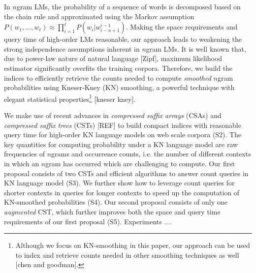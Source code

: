 In $n$gram LMs, the probability of a sequence of words is decomposed based on the chain rule 
and approximated using the Markov assumption 
$P(w_1,\ldots,w_{\ell}) \approx \prod_{i=1}^{\ell} P(w_i|w_{i-n+1}^{i-1})$. 
%
%
Making the space requirements  and query time of high-order LMs reasonable,
our approach leads to weakening the strong independence assumptions inherent in $n$gram LMs.
%
It is well known that, due to power-law nature of natural language [Zipf], maximum likelihood 
estimator significantly overfits the training corpora. 
%
Therefore, we build the indices to efficiently retrieve the counts 
needed to compute \emph{smoothed} $n$gram probabilities using Kneser-Kney (KN) smoothing, 
a powerful technique with elegant statistical properties\footnote{Although 
we focus on KN-smoothing in this paper, our approach can be used to index and retrieve 
counts needed in other smoothing techniques as well [chen and goodman].} [kneser kney].  
 
We make use of recent advances in \emph{compressed suffix arrays} (CSAs)  and
\emph{compressed suffix trees} (CSTs) [REF]  to build compact indices  
with reasonable query time for high-order KN language models on web scale corpora (S2).
%
The key quantities for computing probability under a KN 
language model are raw frequencies of $n$grams 
and occurrence counts, i.e. the number of different contexts in which an $n$gram has 
occurred which are challenging to compute.
%
%
Our first proposal consists of two CSTs and efficient algorithms to answer count queries 
in KN language model (S3). 
% 
We further show how to leverage count queries for shorter contexts in queries for 
longer contexts to speed up the computation of KN-smoothed probabilities (S4).
%
Our second proposal consists of only one \emph{augmented} CST, which 
further improves both the space and query time requirements of our first proposal (S5). 
% 
Experiments ....


%

